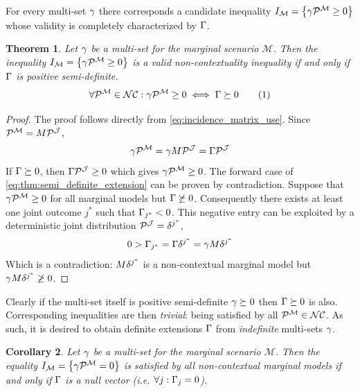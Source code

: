 \documentclass[aps, 10pt, english, twoside, pra, nofootinbib, longbibliography]{revtex4-1}
\theoremstyle{plain}
\newtheorem{theorem}{Theorem}
\newtheorem{corollary}[theorem]{Corollary}
\theoremstyle{definition}
\theoremstyle{remark}
\newcommand{\mscenario}{\mathcal{M}}
\newcommand{\jointvar}{\mathcal{J}}
\newcommand{\tcdot}{} %
\begin{document}
    For every multi-set $\gamma$ there corresponds a candidate inequality $I_{\mscenario} = \bc{\ga \tcdot \probvec^{\mscenario} \geq 0}$ whose validity is completely characterized by $\Gamma$.
    \begin{theorem}
        \label{thm:definite_extension_main_thm}
        Let $\gamma$ be a multi-set for the marginal scenario $\mscenario$. Then the inequality $I_{\mscenario} = \bc{\ga \tcdot \probvec^{\mscenario} \geq 0}$ is a valid non-contextuality inequality if and only if $\Gamma$ is positive semi-definite.
        \[ \forall \probvec^{\mscenario} \in \s{NC} : \ga \tcdot \probvec^{\mscenario} \geq 0 \iff \Ga \succeq 0  \eq \label{eq:thm:semi_definite_extension}\]
    \end{theorem}
    \begin{proof}
        The proof follows directly from \cref{eq:incidence_matrix_use}. Since $\probvec^{\mscenario} = M \tcdot \probvec^{\jointvar}$,
        \[ \ga \tcdot \probvec^{\mscenario} = \ga \tcdot M \tcdot \probvec^{\jointvar} = \Ga \tcdot \probvec^{\jointvar} \]
        If $\Gamma \succeq 0$, then $\Ga \tcdot \probvec^{\jointvar} \geq 0$ which gives $\ga \tcdot \probvec^{\mscenario} \geq 0$. The forward case of \cref{eq:thm:semi_definite_extension} can be proven by contradiction. Suppose that $\ga \tcdot \probvec^{\mscenario} \geq 0$ for all marginal models but $\Gamma \not \succeq 0$. Consequently there exists at least one joint outcome $j^{*}$ such that $\Gamma_{j^{*}} < 0$. This negative entry can be exploited by a deterministic joint distribution $\probvec^{\jointvar} = \de^{j^{*}}$,
        \[ 0 > \Ga_{j^{*}} = \Ga\tcdot \de^{j^{*}} = \ga \tcdot M \tcdot \de^{j^{*}}  \]
        Which is a contradiction: $M \tcdot \de^{j^{*}}$ is a non-contextual marginal model but $\ga \tcdot M \tcdot \de^{j^{*}} \not \geq 0$.
    \end{proof}

    Clearly if the multi-set itself is positive semi-definite $\gamma \succeq 0$ then $\Gamma \succeq 0$ is also. Corresponding inequalities are then \textit{trivial}: being satisfied by all $\probvec^{\mscenario} \in \s{NC}$. As such, it is desired to obtain definite extensions $\Gamma$ from \textit{indefinite} multi-sets $\gamma$.

    \begin{corollary}
        Let $\gamma$ be a multi-set for the marginal scenario $\mscenario$. Then the equality $I_{\mscenario} = \bc{\ga \tcdot \probvec^{\mscenario} = 0}$ is satisfied by all non-contextual marginal models if and only if $\Gamma$ is a null vector (i.e. $\forall j : \Gamma_{j} = 0$).
    \end{corollary}
\end{document}
